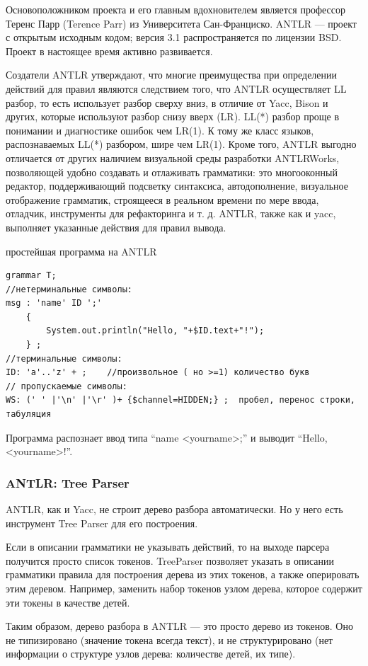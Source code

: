 \documentclass[a4paper,12pt,titlepage]{extarticle}
\begin{document}
Основоположником проекта и его главным вдохновителем является профессор Теренс
Парр (Terence Parr) из Университета Сан-Франциско. ANTLR — проект с открытым
исходным кодом; версия 3.1 распространяется по лицензии BSD. Проект в
настоящее время активно развивается.

Создатели ANTLR утверждают, что многие преимущества при определении действий
для правил являются следствием того, что ANTLR осуществляет LL разбор, то есть
использует разбор сверху вниз, в отличие от Yacc, Bison и других, которые
используют разбор снизу вверх (LR). LL(*) разбор проще в понимании и
диагностике ошибок чем LR(1). К тому же класс языков, распознаваемых LL(*)
разбором, шире чем LR(1). Кроме того, ANTLR выгодно отличается от других
наличием визуальной среды разработки ANTLRWorks, позволяющей удобно создавать и
отлаживать грамматики: это многооконный редактор, поддерживающий подсветку
синтаксиса, автодополнение, визуальное отображение грамматик, строящееся в
реальном времени по мере ввода, отладчик, инструменты для рефакторинга и т. д.
ANTLR, также как и yacc, выполняет указанные действия для правил вывода.

простейшая программа на ANTLR
\begin{verbatim}
grammar T;
//нетерминальные символы:
msg : 'name' ID ';' 
	{
		System.out.println("Hello, "+$ID.text+"!");
	} ;
//терминальные символы:
ID: 'a'..'z' + ;	//произвольное ( но >=1) количество букв
// пропускаемые символы:
WS: (' ' |'\n' |'\r' )+ {$channel=HIDDEN;} ;  пробел, перенос строки, табуляция
\end{verbatim}
Программа распознает ввод типа ``name <yourname>;'' и выводит ``Hello,
<yourname>!''.

\subsubsection*{ANTLR: Tree Parser}
ANTLR, как и Yacc, не строит дерево разбора автоматически. Но у него есть
инструмент Tree Parser для его построения.

Если в описании грамматики не указывать действий, то на выходе парсера получится
просто список токенов. TreeParser позволяет указать в описании грамматики
правила для построения дерева из этих токенов, а также оперировать этим деревом.
Например, заменить набор токенов узлом дерева, которое содержит эти токены в
качестве детей.

Таким образом, дерево разбора в ANTLR --- это просто дерево из токенов. Оно не
типизировано (значение токена всегда текст), и не структурировано (нет
информации о структуре узлов дерева: количестве детей, их типе).
\end{document}
